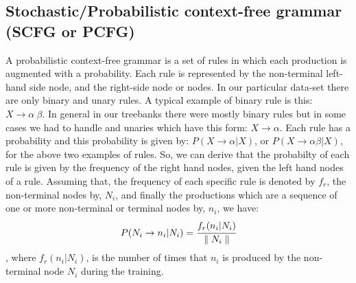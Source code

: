 \documentclass[a4paper,11pt]{article}
\begin{document}
\subsection{Stochastic/Probabilistic context-free grammar (SCFG or PCFG)}
A probabilistic context-free grammar is a set of rules in which each production is augmented with a probability. Each rule is represented by the non-terminal left-hand side node, and the right-side node or nodes. In our particular data-set there are only binary and unary rules. A typical example of  binary rule is this: $X \rightarrow \alpha\	 \beta$. In general in our treebanks there were mostly binary rules but in some cases we had to handle and unaries which have this form: $X \rightarrow \alpha$. Each rule has a probability and this probability is given by: $P(X \rightarrow \alpha | X)$, or $P(X \rightarrow \alpha \beta| X)$, for the above two examples of rules. So, we can derive that the probabilty of each rule is given by the frequency of the right hand nodes, given the left hand nodes of a rule. Assuming that, the frequency of each specific rule is denoted by $f_r$, the non-terminal nodes by, $N_i$, and finally the productions which are a sequence of one or more non-terminal or terminal nodes by, $n_i$, we have:
\[
P(N_i \rightarrow n_i | N_i) = \cfrac{f_r(n_i | N_i)}{\parallel N_i \parallel}
\]
, where $f_r(n_i | N_i)$, is the number of times that $n_i$ is produced by the non-terminal node $N_i$ during the training.
\end{document}
